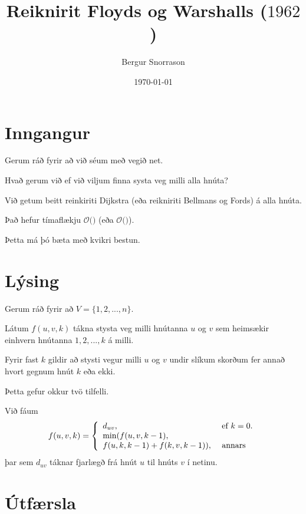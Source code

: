 \title{Reiknirit Floyds og Warshalls ($1962$)}
\author{Bergur Snorrason}
\date{\today}



\frame{\titlepage}

\section{Inngangur}
{
    {
        \item<1-> Gerum ráð fyrir að við séum með vegið net.
        \item<2-> Hvað gerum við ef við viljum finna systa veg milli alla hnúta?
        \item<3-> Við getum beitt reinkiriti Dijkstra (eða reikniriti Bellmans og Fords) á alla hnúta.
        \item<4-> Það hefur tímaflækju $\mathcal{O}($$)$ (eða
                    $\mathcal{O}($$)$).
        \item<7-> Þetta má þó bæta með kvikri bestun.
    }
}

\section{Lýsing}
{
    {
        \item<1-> Gerum ráð fyrir að $V = \{1, 2, ..., n\}$.
        \item<2-> Látum $f(u, v, k)$ tákna stysta veg milli hnútanna $u$ og $v$ sem heimsækir einhvern hnútanna $1, 2, ..., k$ á milli.
        \item<3-> Fyrir fast $k$ gildir að stysti vegur milli $u$ og $v$ undir slíkum skorðum fer annað hvort gegnum hnút $k$ eða ekki.
        \item<4-> Þetta gefur okkur tvö tilfelli.
        \item<5-> Við fáum
        \[
            f(u, v, k) = \left \{
            \env{array}
            {    {l l}
                d_{uv}, & \text{ ef $k = 0$}.\\
                \min(f(u, v, k - 1), &\\
                    f(u, k, k - 1) + f(k, v, k - 1)), & \text{ annars}
            }
            \right .
        \]
                þar sem $d_{uv}$ táknar fjarlægð frá hnút $u$ til hnúts $v$ í netinu.
    }
}

\section{Útfærsla}
{
}

